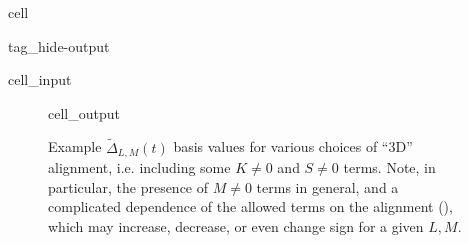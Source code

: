 \documentclass[letterpaper,table,10pt,english]{jupyterBook}
\begin{document}
\begin{sphinxuseclass}{cell}
\begin{sphinxuseclass}{tag_hide-output}
\begin{sphinxVerbatimInput}
\begin{sphinxuseclass}{cell_input}
\begin{sphinxVerbatim}[commandchars=\\\{\}]

         
                                                          

  
\end{sphinxVerbatim}

\end{sphinxuseclass}\end{sphinxVerbatimInput}

\end{sphinxuseclass}
\end{sphinxuseclass}
\begin{figure}[htbp]
\centering
\capstart
\begin{sphinxVerbatimOutput}

\begin{sphinxuseclass}{cell_output}
\noindent{}

\end{sphinxuseclass}\end{sphinxVerbatimOutput}
\caption{Example \(\tilde{\Delta}_{L,M}(t)\) basis values for various choices of “3D” alignment, i.e. including some \(K\neq0\) and \(S\neq0\) terms. Note, in particular, the presence of \(M\neq0\) terms in general, and a complicated dependence of the allowed terms on the alignment ({\hyperref[\detokenize{backmatter/glossary:term-ADMs}]{}}), which may increase, decrease, or even change sign for a given \(L,M\).}\label{\detokenize{part1/theory_tensor_formalism_201122:fig-adms-3dlinearramp}}\end{figure}
\end{document}
